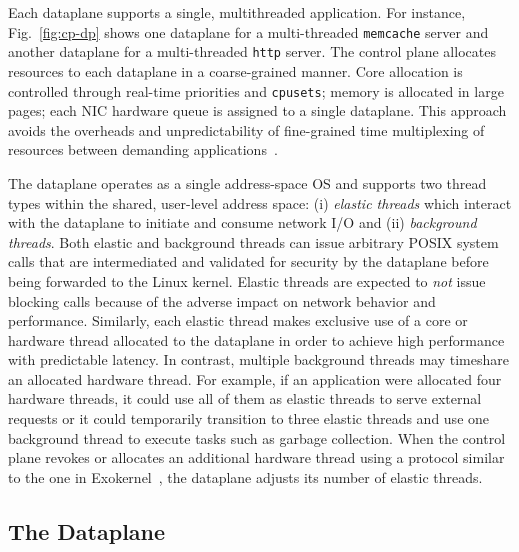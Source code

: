 Each \ix dataplane supports a single, multithreaded application. For
instance, Fig.~\ref{fig:cp-dp} shows one dataplane for a
multi-threaded \texttt{memcache} server and another dataplane for a
multi-threaded \texttt{http} server. The control plane allocates
resources to each dataplane in a coarse-grained manner. Core
allocation is controlled through real-time priorities and
\texttt{cpusets}; memory is allocated in large pages; each NIC
hardware queue is assigned to a single dataplane. This approach avoids
the overheads and unpredictability of fine-grained time multiplexing
of resources between demanding
applications~\cite{DBLP:conf/eurosys/LeverichK14}.

The \ix dataplane operates as a single address-space OS and supports
two thread types within the shared, user-level address space: (i)
\emph{elastic threads} which interact with the \ix dataplane to
initiate and consume network I/O and (ii) \emph{background threads}.
Both elastic and background threads can issue arbitrary POSIX system
calls that are intermediated and validated for security by the
dataplane before being forwarded to the Linux kernel. Elastic threads
are expected to \emph{not} issue blocking calls because of the adverse
impact on network behavior and performance. Similarly, each elastic
thread makes exclusive use of a core or hardware thread allocated to
the dataplane in order to achieve high performance with predictable
latency. In contrast, multiple background threads may timeshare an
allocated hardware thread. For example, if an application were
allocated four hardware threads, it could use all of them as elastic
threads to serve external requests or it could temporarily transition
to three elastic threads and use one background thread to execute
tasks such as garbage collection. When the control plane revokes or
allocates an additional hardware thread using a protocol similar to
the one in Exokernel~\cite{DBLP:conf/sosp/EnglerKO95}, the dataplane
adjusts its number of elastic threads.


\subsection{The \ix Dataplane}
\label{sec:impl:dpkernel}

